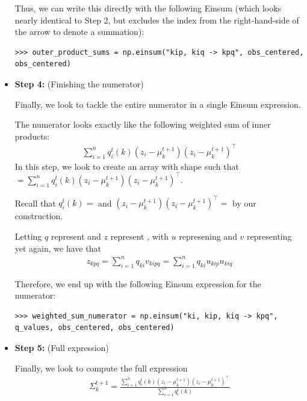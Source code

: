\begin{itemize}
Thus, we can write this directly with the following Einsum (which looks nearly identical to Step 2, but excludes the index  from the right-hand-side of the arrow to denote a summation):
\begin{lstlisting}
>>> outer_product_sums = np.einsum("kip, kiq -> kpq", obs_centered, obs_centered)
\end{lstlisting}

\item \textbf{Step 4:} (Finishing the numerator)

Finally, we look to tackle the entire numerator in a single Einsum expression.

The numerator looks exactly like the following weighted sum of inner products:
\begin{align*}
	\sum_{i=1}^{n} q_i^t(k) (z_i - \mu_k^{t+1})(z_i - \mu_k^{t+1})^\top
\end{align*}
In this step, we look to create an array  with shape  such that \newline {} $ = \sum_{i=1}^{n}  q_i^t(k) (z_i - \mu_k^{t+1}) (z_i - \mu_k^{t+1})^\top$.

Recall that $q_i^t(k) = $  and $(z_i - \mu_k^{t+1}) (z_i - \mu_k^{t+1})^\top = $  by our construction.

Letting $q$ represent  and $z$ represent , with $u$ represening  and $v$ representing  yet again, we have that
\begin{align*}
	z_{kpq} = \sum_{i=1}^{n}q_{ki}v_{kipq} = \sum_{i=1}^{n}q_{ki}u_{kip}u_{kiq}
\end{align*}

Therefore, we end up with the following Einsum expression for the numerator:
\begin{lstlisting}
>>> weighted_sum_numerator = np.einsum("ki, kip, kiq -> kpq", q_values, obs_centered, obs_centered)
\end{lstlisting}

\item \textbf{Step 5:} (Full expression)

Finally, we look to compute the full expression
\begin{align*}
	\Sigma_k^{t+1} = \frac{\sum_{i=1}^{n} q_i^t(k) (z_i - \mu_k^{t+1}) (z_i - \mu_k^{t+1})^\top}{\sum_{i=1}^{n} q_i^t(k)}
\end{align*}


\end{itemize}
